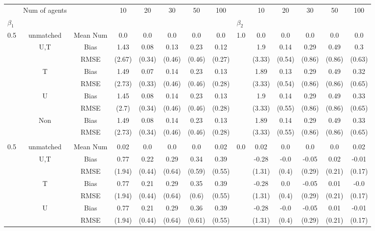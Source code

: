 \begin{tabular}{@{\extracolsep{5pt}}lc|cccccc|lccccc}
\toprule 
 & Num of agents &  & 10 & 20 & 30 & 50 & 100 &  & 10 & 20 & 30 & 50 & 100 \\
$\beta_1$ &  &  &  &  &  &  &  & $\beta_2$ &  &  &  &  &  \\
\midrule 
0.5 & unmatched & Mean Num & 0.0 & 0.0 & 0.0 & 0.0 & 0.0 & 1.0 & 0.0 & 0.0 & 0.0 & 0.0 & 0.0 \\
 & U,T & Bias & 1.43 & 0.08 & 0.13 & 0.23 & 0.12 &  & 1.9 & 0.14 & 0.29 & 0.49 & 0.3 \\
 &  & RMSE & (2.67) & (0.34) & (0.46) & (0.46) & (0.27) &  & (3.33) & (0.54) & (0.86) & (0.86) & (0.63) \\
 & T & Bias & 1.49 & 0.07 & 0.14 & 0.23 & 0.13 &  & 1.89 & 0.13 & 0.29 & 0.49 & 0.32 \\
 &  & RMSE & (2.73) & (0.33) & (0.46) & (0.46) & (0.28) &  & (3.33) & (0.54) & (0.86) & (0.86) & (0.65) \\
 & U & Bias & 1.45 & 0.08 & 0.14 & 0.23 & 0.13 &  & 1.9 & 0.14 & 0.29 & 0.49 & 0.33 \\
 &  & RMSE & (2.7) & (0.34) & (0.46) & (0.46) & (0.28) &  & (3.33) & (0.55) & (0.86) & (0.86) & (0.65) \\
 & Non & Bias & 1.49 & 0.08 & 0.14 & 0.23 & 0.13 &  & 1.89 & 0.14 & 0.29 & 0.49 & 0.33 \\
 &  & RMSE & (2.73) & (0.34) & (0.46) & (0.46) & (0.28) &  & (3.33) & (0.55) & (0.86) & (0.86) & (0.65) \\
 &  &  &  &  &  &  &  &  &  &  &  &  &  \\
0.5 & unmatched & Mean Num & 0.02 & 0.0 & 0.0 & 0.0 & 0.02 & 0.0 & 0.02 & 0.0 & 0.0 & 0.0 & 0.02 \\
 & U,T & Bias & 0.77 & 0.22 & 0.29 & 0.34 & 0.39 &  & -0.28 & -0.0 & -0.05 & 0.02 & -0.01 \\
 &  & RMSE & (1.94) & (0.44) & (0.64) & (0.59) & (0.55) &  & (1.31) & (0.4) & (0.29) & (0.21) & (0.17) \\
 & T & Bias & 0.77 & 0.21 & 0.29 & 0.35 & 0.39 &  & -0.28 & 0.0 & -0.05 & 0.01 & -0.0 \\
 &  & RMSE & (1.94) & (0.44) & (0.64) & (0.6) & (0.55) &  & (1.31) & (0.4) & (0.29) & (0.21) & (0.17) \\
 & U & Bias & 0.77 & 0.21 & 0.29 & 0.36 & 0.39 &  & -0.28 & -0.0 & -0.05 & 0.01 & -0.01 \\
 &  & RMSE & (1.94) & (0.44) & (0.64) & (0.61) & (0.55) &  & (1.31) & (0.4) & (0.29) & (0.21) & (0.17) \\

\end{tabular}
